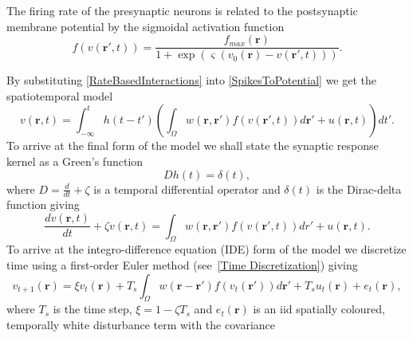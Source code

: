 \documentclass[12pt]{iopart}
\begin{document}
The firing rate of the presynaptic neurons is related to the postsynaptic membrane potential by the sigmoidal activation function 
\begin{equation}
	\label{ActivationFunction} f\left( v\left( \mathbf{r}', t \right) \right) = \frac{f_{max}\left(\mathbf{r}\right)}{1 + \exp \left( \varsigma \left( v_0\left( \mathbf{r} \right) - v\left(\mathbf{r}',t\right) \right) \right)}. 
\end{equation}

By substituting \ref{RateBasedInteractions} into \ref{SpikesToPotential} we get the spatiotemporal model 
\begin{equation}
	\label{FullDoubleIntModel} v\left(\mathbf{r},t\right) = \int_{-\infty}^t h\left(t - t'\right) \left(\int_\Omega w\left(\mathbf{r},\mathbf{r}'\right) f\left( v\left( \mathbf{r}',t \right)\right)d\mathbf{r}' + u(\mathbf{r},t) \right)dt'. 
\end{equation}
To arrive at the final form of the model we shall state the synaptic response kernel as a Green's function 
\begin{equation}
	\label{GreensFuncDef} Dh\left( t \right) = \delta \left( t \right), 
\end{equation}
where $D=\frac{d}{dt} + \zeta$ is a temporal differential operator and $\delta(t)$ is the Dirac-delta function giving 
\begin{equation}
	\label{FinalFormContinuous} \frac{dv\left( \mathbf{r},t \right)}{dt} + \zeta v\left( \mathbf{r},t \right) = \int_\Omega {w\left( \mathbf{r},\mathbf{r}' \right)f\left( {v\left( \mathbf{r}',t \right)} \right)dr'} + u\left(\mathbf{r},t\right). 
\end{equation}
To arrive at the integro-difference equation (IDE) form of the model we discretize time using a first-order Euler method (see~\ref{Time Discretization}) giving 
\begin{equation}
	\label{DiscreteTimeModel} v_{t+1}\left(\mathbf{r}\right) = \xi v_t\left(\mathbf{r}\right) + T_s \int_\Omega { w\left(\mathbf{r}-\mathbf{r}'\right) f\left(v_t\left(\mathbf{r}'\right)\right) d\mathbf{r}'} + T_s u_t\left(\mathbf{r}\right) + e_t\left(\mathbf{r}\right), 
\end{equation}
where $T_s$ is the time step, $\xi = 1-\zeta T_s$ and $e_t\left(\mathbf{r}\right)$ is an iid spatially coloured, temporally white disturbance term with the covariance 
\end{document}
